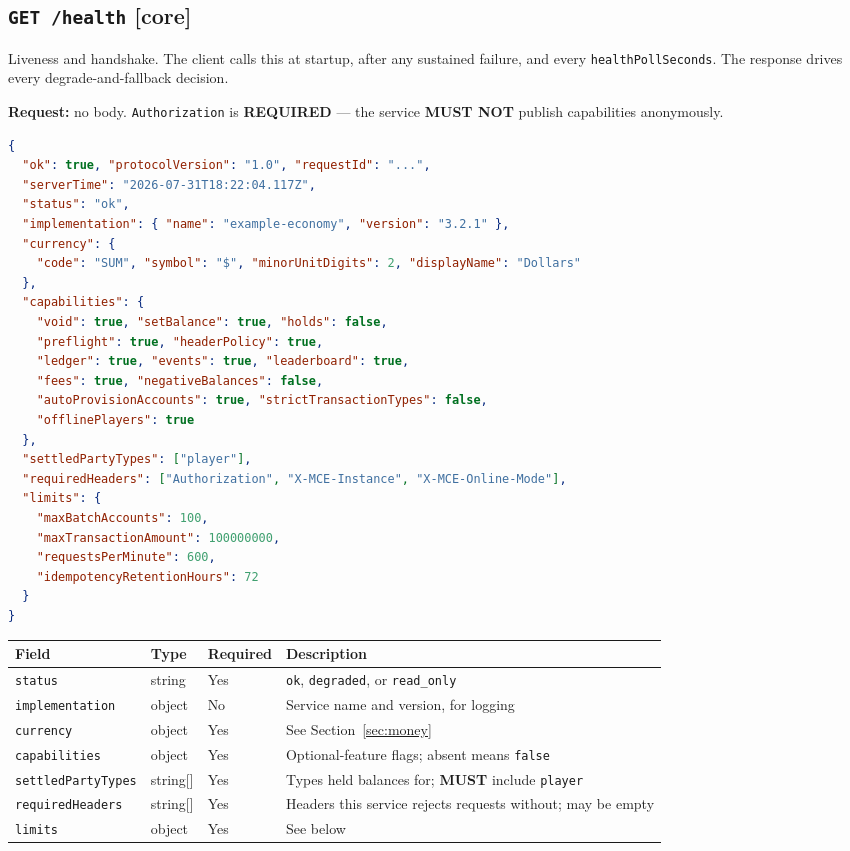 \documentclass[11pt,a4paper]{article}
\newcommand{\code}[1]{\texttt{\small #1}}
\newcommand{\req}{\textbf{MUST}}
\newcommand{\core}{{\small\color{omceAccentDark}\textbf{[core]}}}
\begin{document}
\subsection{\code{GET /health} \core}
\label{sec:health}

Liveness and handshake. The client calls this at startup, after any sustained failure, and every
\code{healthPollSeconds}. The response drives every degrade-and-fallback decision.

\textbf{Request:} no body. \code{Authorization} is \textbf{REQUIRED} --- the service \textbf{MUST
NOT} publish capabilities anonymously.

\begin{lstlisting}[language=json]
{
  "ok": true, "protocolVersion": "1.0", "requestId": "...",
  "serverTime": "2026-07-31T18:22:04.117Z",
  "status": "ok",
  "implementation": { "name": "example-economy", "version": "3.2.1" },
  "currency": {
    "code": "SUM", "symbol": "$", "minorUnitDigits": 2, "displayName": "Dollars"
  },
  "capabilities": {
    "void": true, "setBalance": true, "holds": false,
    "preflight": true, "headerPolicy": true,
    "ledger": true, "events": true, "leaderboard": true,
    "fees": true, "negativeBalances": false,
    "autoProvisionAccounts": true, "strictTransactionTypes": false,
    "offlinePlayers": true
  },
  "settledPartyTypes": ["player"],
  "requiredHeaders": ["Authorization", "X-MCE-Instance", "X-MCE-Online-Mode"],
  "limits": {
    "maxBatchAccounts": 100,
    "maxTransactionAmount": 100000000,
    "requestsPerMinute": 600,
    "idempotencyRetentionHours": 72
  }
}
\end{lstlisting}

\begin{tabularx}{\linewidth}{L{3.6cm} L{1.9cm} L{1.7cm} X}
\toprule
\textbf{Field} & \textbf{Type} & \textbf{Required} & \textbf{Description}\\
\midrule
\code{status}            & string   & Yes & \code{ok}, \code{degraded}, or \code{read\_only}\\
\code{implementation}    & object   & No  & Service name and version, for logging\\
\code{currency}          & object   & Yes & See Section~\ref{sec:money}\\
\code{capabilities}      & object   & Yes & Optional-feature flags; absent means \code{false}\\
\code{settledPartyTypes} & string[] & Yes & Types held balances for; \req{} include \code{player}\\
\code{requiredHeaders}   & string[] & Yes & Headers this service rejects requests without; may be empty\\
\code{limits}            & object   & Yes & See below\\
\bottomrule
\end{tabularx}
\end{document}
